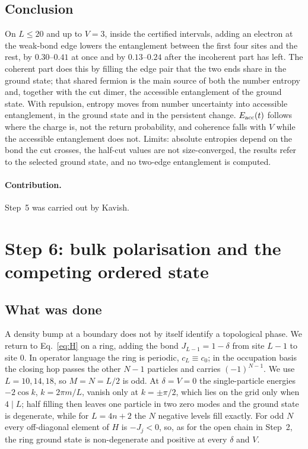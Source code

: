 \documentclass[11pt,a4paper]{article}
\begin{document}
\subsection{Conclusion}

On $L\le20$ and up to $V=3$, inside the certified intervals, adding an electron at the weak-bond edge lowers the entanglement between the first four sites and the rest, by $0.30$--$0.41$ at once and by $0.13$--$0.24$ after the incoherent part has left.
The coherent part does this by filling the edge pair that the two ends share in the ground state; that shared fermion is the main source of both the number entropy and, together with the cut dimer, the accessible entanglement of the ground state.
With repulsion, entropy moves from number uncertainty into accessible entanglement, in the ground state and in the persistent change.
$E_{\rm acc}(t)$ follows where the charge is, not the return probability, and coherence falls with $V$ while the accessible entanglement does not.
Limits: absolute entropies depend on the bond the cut crosses, the half-cut values are not size-converged, the results refer to the selected ground state, and no two-edge entanglement is computed.

\paragraph{Contribution.} Step~5 was carried out by Kavish.

\section{Step 6: bulk polarisation and the competing ordered state}
\label{sec:step6}

\subsection{What was done}

A density bump at a boundary does not by itself identify a topological phase.
We return to Eq.~\eqref{eq:H} on a ring, adding the bond $J_{L-1}=1-\delta$ from site $L-1$ to site $0$.
In operator language the ring is periodic, $c_L\equiv c_0$; in the occupation basis the closing hop passes the other $N-1$ particles and carries $(-1)^{N-1}$.
We use $L=10,14,18$, so $M=N=L/2$ is odd.
At $\delta=V=0$ the single-particle energies $-2\cos k$, $k=2\pi m/L$, vanish only at $k=\pm\pi/2$, which lies on the grid only when $4\mid L$; half filling then leaves one particle in two zero modes and the ground state is degenerate, while for $L=4n+2$ the $N$ negative levels fill exactly.
For odd $N$ every off-diagonal element of $H$ is $-J_j<0$, so, as for the open chain in Step~2, the ring ground state is non-degenerate and positive at every $\delta$ and $V$.
\end{document}
